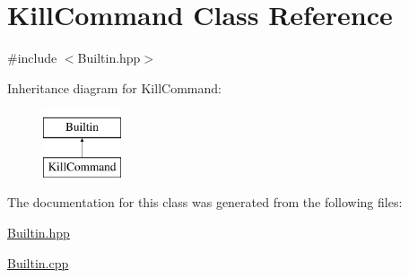 \hypertarget{classKillCommand}{
\section{KillCommand Class Reference}
\label{classKillCommand}
}


{\ttfamily \#include $<$Builtin.hpp$>$}

Inheritance diagram for KillCommand:\begin{figure}[H]
\begin{center}
\leavevmode
\includegraphics[height=2.000000cm]{classKillCommand}
\end{center}
\end{figure}


The documentation for this class was generated from the following files:\begin{DoxyCompactItemize}
\item 
\hyperlink{Builtin_8hpp}{Builtin.hpp}\item 
\hyperlink{Builtin_8cpp}{Builtin.cpp}\end{DoxyCompactItemize}
